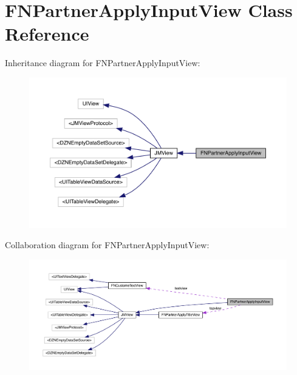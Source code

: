\hypertarget{interface_f_n_partner_apply_input_view}{}\section{F\+N\+Partner\+Apply\+Input\+View Class Reference}
\label{interface_f_n_partner_apply_input_view}


Inheritance diagram for F\+N\+Partner\+Apply\+Input\+View\+:\nopagebreak
\begin{figure}[H]
\begin{center}
\leavevmode
\includegraphics[width=350pt]{interface_f_n_partner_apply_input_view__inherit__graph}
\end{center}
\end{figure}


Collaboration diagram for F\+N\+Partner\+Apply\+Input\+View\+:\nopagebreak
\begin{figure}[H]
\begin{center}
\leavevmode
\includegraphics[width=350pt]{interface_f_n_partner_apply_input_view__coll__graph}
\end{center}
\end{figure}
